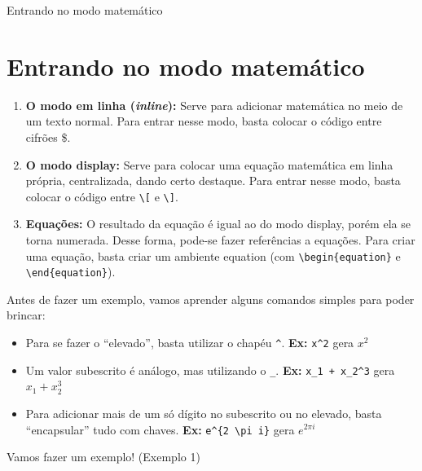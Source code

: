 \documentclass[12pt]{beamer}
\begin{document}
\begin{frame}[fragile]{Entrando no modo matemático}
  \section{Entrando no modo matemático}
  \begin{enumerate}
    \item \textbf{O modo em linha (\textit{inline}):} Serve para adicionar matemática no meio de um texto normal. Para entrar nesse modo, basta colocar o código entre cifrões \$.

    \item \textbf{O modo display:} Serve para colocar uma equação matemática em linha própria, centralizada, dando certo destaque. Para entrar nesse modo, basta colocar o código entre \verb+\[+ e \verb+\]+.

    \item \textbf{Equações:} O resultado da equação é igual ao do modo display, porém ela se torna numerada. Desse forma, pode-se fazer referências a equações. Para criar uma equação, basta criar um ambiente equation (com \verb+\begin{equation}+ e \verb+\end{equation}+).

  \end{enumerate}
\end{frame}

\begin{frame}[fragile]
  Antes de fazer um exemplo, vamos aprender alguns comandos simples para poder brincar:
  \begin{itemize}
    \item Para se fazer o ``elevado'', basta utilizar o chapéu \verb+^+. \textbf{Ex:} \verb+x^2+ gera $x^2$
    \item Um valor subescrito é análogo, mas utilizando o \verb+_+. \textbf{Ex:} \verb-x_1 + x_2^3- gera $x_1 + x_2^3$
    \item Para adicionar mais de um só dígito no subescrito ou no elevado, basta ``encapsular'' tudo com chaves. \textbf{Ex:} \verb-e^{2 \pi i}- gera $e^{2 \pi i}$
  \end{itemize}
\end{frame}

\begin{frame}
  Vamos fazer um exemplo! (Exemplo 1)
\end{frame}
\end{document}
